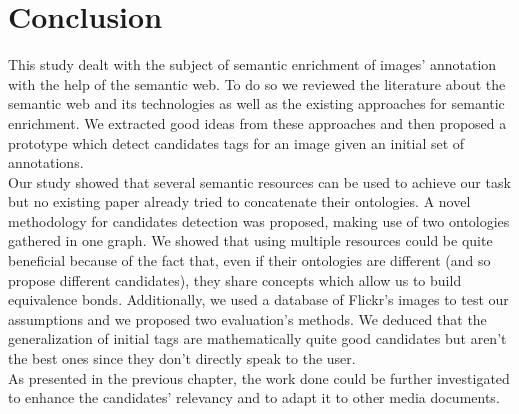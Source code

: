 
\chapter{Conclusion} %

\label{chapter:ContributionConclusion} %


This study dealt with the subject of semantic enrichment of images' annotation with the help of the semantic web. To do so we reviewed the literature about the semantic web and its technologies as well as the existing approaches for semantic enrichment. We extracted good ideas from these approaches and then proposed a prototype which detect candidates tags for an image given an initial set of annotations.\\

Our study showed that several semantic resources can be used to achieve our task but no existing paper already tried to concatenate their ontologies. A novel methodology for candidates detection was proposed, making use of two ontologies gathered in one graph. We showed that using multiple resources could be quite beneficial because of the fact that, even if their ontologies are different (and so propose different candidates), they share concepts which allow us to build equivalence bonds. Additionally, we used a database of Flickr's images to test our assumptions and we proposed two evaluation's methods. We deduced that the generalization of initial tags are mathematically quite good candidates but aren't the best ones since they don't directly speak to the user.\\

As presented in the previous chapter, the work done could be further investigated to enhance the candidates' relevancy and to adapt it to other media documents. 